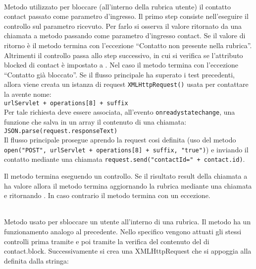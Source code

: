 \begin{description}
\item{}\\
Metodo utilizzato per bloccare (all'interno della rubrica utente) il contatto contact passato come parametro d'ingresso. Il primo step consiste nell'eseguire il controllo sul parametro ricevuto. Per farlo si osserva il valore ritornato da una chiamata a metodo  passando come parametro d'ingresso contact. Se il valore di ritorno è  il metodo termina con l'eccezione ``Contatto non presente nella rubrica''. Altrimenti il controllo passa allo step successivo, in cui si verifica se l'attributo blocked di contact è impostato a . Nel caso il metodo termina con l'eccezione ``Contatto già bloccato''. Se il flusso principale ha superato i test precedenti, allora viene creata un istanza di request \texttt{XMLHttpRequest()} usata per contattare la  avente nome:\\

\verb|urlServlet + operations[8] + suffix|\\

Per tale richiesta deve essere associata, all'evento \texttt{onreadystatechange}, una funzione che salva in un array il contenuto di una chiamata:\\

\verb|JSON.parse(request.responseText)|\\

Il flusso principale prosegue aprendo la request cosi definita (uso del metodo \texttt{open("POST", urlServlet + operations[8] + suffix, "true")}) e inviando il contatto mediante una chiamata \texttt{request.send("contactId=" + contact.id)}.

Il metodo termina eseguendo un controllo. Se il risultato result della chiamata a  ha valore  allora il metodo termina aggiornando la rubrica mediante una chiamata  e ritornando . In caso contrario il metodo termina con un eccezione.

\item{}\\
Metodo usato per sbloccare un utente all'interno di una rubrica. Il metodo ha un funzionamento analogo al precedente. Nello specifico vengono attuati gli stessi controlli prima tramite  e poi tramite la verifica del contenuto del di contact.block. Successivamente si crea una XMLHttpRequest che si appoggia alla  definita dalla stringa:\\


\end{description}

